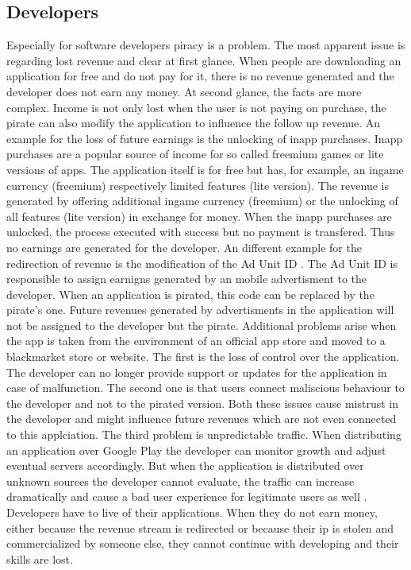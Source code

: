 \subsection{Developers} \label{subsection:foundation-piracy-developers}
Especially for software developers piracy is a problem.
The most apparent issue is regarding lost revenue and clear at first glance.
\newline
When people are downloading an application for free and do not pay for it, there is no revenue generated and the developer does not earn any money.
\newline
At second glance, the facts are more complex.
Income is not only lost when the user is not paying on purchase, the pirate can also modify the application to influence the follow up revenue.
An example for the loss of future earnings is the unlocking of inapp purchases.
Inapp purchases are a popular source of income for so called freemium games or lite versions of apps.
The application itself is for free but has, for example, an ingame currency (freemium) respectively limited features (lite version).
The revenue is generated by offering additional ingame currency (freemium) or the unlocking of all features (lite version) in exchange for money.
When the inapp purchases are unlocked, the process executed with success but no payment is transfered.
Thus no earnings are generated for the developer.
\newline
An different example for the redirection of revenue is the modification of the Ad Unit ID \cite{googleAdmob}.
The Ad Unit ID is responsible to assign earnigns generated by an mobile advertisment to the developer.
When an application is pirated, this code can be replaced by the pirate's one. Future revenues generated by advertisments in the application will not be assigned to the developer but the pirate.
\newline
\newline
Additional problems arise when the app is taken from the environment of an official app store and moved to a blackmarket store or website.
The first is the loss of control over the application.
The developer can no longer provide support or updates for the application in case of malfunction.
The second one is that users connect maliscious behaviour to the developer and not to the pirated version.
Both these issues cause mistrust in the developer and might influence future revenues which are not even connected to this applciation.
The third problem is unpredictable traffic.
When distributing an application over Google Play the developer can monitor growth and adjust eventual servers accordingly.
But when the application is distributed over unknown sources the developer cannot evaluate, the traffic can increase dramatically and cause a bad user experience for legitimate users as well \cite{lierschDeveloperThreats}.
\newline
\newline
Developers have to live of their applications.
When they do not earn money, either because the revenue stream is redirected or because their \gls{ip} is stolen and commercialized by someone else, they cannot continue with developing and their skills are lost.



